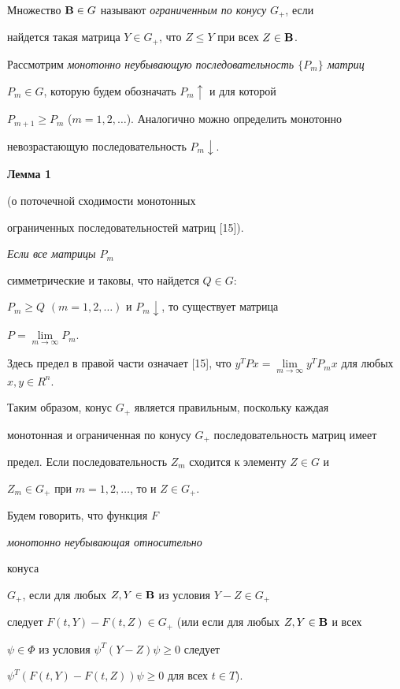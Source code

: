 Множество $\bold B\in G$ называют {\it ограниченным по конусу} $G_+$, если


найдется такая матрица $Y\in G_+$, что $Z\le Y$ при всех $Z\in\bold B$.





Рассмотрим {\it монотонно неубывающую последовательность $\{P_m\}$ матриц}


$P_m\in G$, которую будем обозначать $P_m\uparrow$ и для которой


$P_{m+1}\ge P_m$ ($m=1,2,\dotsc$). Аналогично можно определить монотонно


невозрастающую последовательность $P_m\downarrow$.


\medskip





{\bf Лемма 1}


(о поточечной сходимости монотонных


ограниченных последовательностей матриц [15]). {\it Если все матрицы $P_m$


симметрические и таковы, что найдется $Q\in G:$


$P_m\ge Q$ $(m=1,2,\dotsc)$ и $P_m\downarrow$, то существует матрица}


$P=\lim\limits_{m\to\infty}P_m$.


\medskip


\addtocounter{lem}{1}





Здесь предел в правой части означает [15], что $y^T


Px=\lim\limits_{m\to\infty}y^T P_mx$ для любых $x,y\in R^n$.





Таким образом, конус $G_+$ является правильным, поскольку каждая


монотонная и ограниченная по конусу $G_+$ последовательность матриц имеет


предел. Если последовательность $Z_m$ сходится к элементу $Z\in G$ и


$Z_m\in G_+$ при $m=1,2,\dotsc$, то и $Z\in G_+$.





\begin{defn}


Будем говорить, что функция $F$ {\it монотонно неубывающая относительно


конуса} $G_+$, если для любых $Z,Y\in\bold B$ из условия $Y-Z\in G_+$


следует $F(t,Y)-F(t,Z)\in G_+$ (или если для любых $Z,Y\in\bold B$ и всех


$\psi\in\Phi$ из условия $\psi^T(Y-Z)\psi\ge0$ следует


$\psi^T(F(t,Y)-F(t,Z))\psi\ge0$ для всех $t\in T$).


\end{defn}





